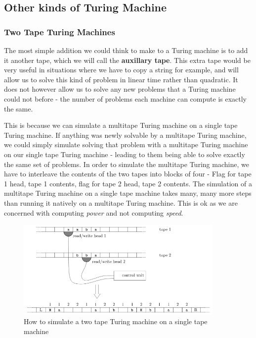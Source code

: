 \documentclass[11pt]{article}
\begin{document}
	\subsection{Other kinds of Turing Machine}
	\subsubsection{Two Tape Turing Machines}
	The most simple addition we could think to make to a Turing machine is to add it another tape, which we will call the \textbf{auxillary tape}. This extra tape would be very useful in situations where we have to copy a string for example, and will allow us to solve this kind of problem in linear time rather than quadratic. It does not however allow us to solve any new problems that a Turing machine could not before - the number of problems each machine can compute is exactly the same.
	
	\par 
	This is because we can simulate a multitape Turing machine on a single tape Turing machine. If anything was newly solvable by a multitape Turing machine, we could simply simulate solving that problem with a multitape Turing machine on our single tape Turing machine - leading to them being able to solve exactly the same set of problems. In order to simulate the multitape Turing machine, we have to interleave the contents of the two tapes into blocks of four - Flag for tape 1 head, tape 1 contents, flag for tape 2 head, tape 2 contents. The simulation of a multitape Turing machine on a single tape machine takes many, many more steps than running it natively on a multitape Turing machine. This is ok as we are concerned with computing \textit{power} and not computing \textit{speed}.
	
	\begin{figure}[ht]
		\centering
		\includegraphics[width=0.9\textwidth]{two_tape_turing_machine}
		\caption{How to simulate a two tape Turing machine on a single tape machine}
		\label{fig:two tape turing machine}
	\end{figure}
	
\end{document}
